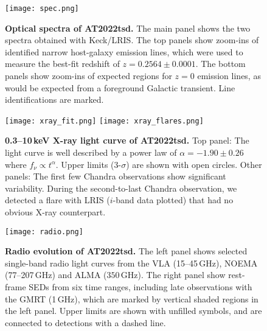 \documentclass{nature_plusfigure}
\newcommand{\at}{AT2022tsd}
\begin{document}
\begin{extended_data}

\renewcommand{\thefigure}{\arabic{figure}~Extended~Data}
\renewcommand{\thefigure}{Extended Data Figure \arabic{figure}}
\renewcommand{\figurename}{}
\setcounter{figure}{0}

\renewcommand{\thetable}{\arabic{table}~Extended~Data}
\renewcommand{\thetable}{Extended Data Table \arabic{table}}
\renewcommand{\tablename}{}
\setcounter{table}{0}

\begin{figure}[ht]
 \centering
\texttt{[image: spec.png]}
  \caption{\textbf{Optical spectra of \at.} The main panel shows the two spectra obtained with Keck/LRIS. The top panels show zoom-ins of identified narrow host-galaxy emission lines, which were used to measure the best-fit redshift of $z=0.2564\pm0.0001$. The bottom panels show zoom-ins of expected regions for $z=0$ emission lines, as would be expected from a foreground Galactic transient. Line identifications are marked.}
 \label{fig:spec}
\end{figure}

\begin{figure}[!ht]
 \centering
\texttt{[image: xray\_fit.png]}
\texttt{[image: xray\_flares.png]}
  \caption{\textbf{0.3--10\,keV X-ray light curve of \at.} Top panel: The light curve is well described by a power law of $\alpha=-1.90\pm0.26$ where $f_\nu \propto t^{\alpha}$. Upper limits (3-$\sigma$) are shown with open circles. Other panels: The first few Chandra observations show significant variability. During the second-to-last Chandra observation, we detected a flare with LRIS ($i$-band data plotted) that had no obvious X-ray counterpart.}
 \label{fig:xray-lc}
\end{figure}

\begin{figure}[!ht]
 \centering
\texttt{[image: radio.png]}
  \caption{\textbf{Radio evolution of \at.} The left panel shows selected single-band radio light curves from the VLA (15--45\,GHz), NOEMA (77--207\,GHz) and ALMA ($350$\,GHz). The right panel show rest-frame SEDs from six time ranges, including late observations with the GMRT (1\,GHz), which are marked by vertical shaded regions in the left panel. Upper limits are shown with unfilled symbols, and are connected to detections with a dashed line.}
 \label{fig:radio}
\end{figure}


\end{extended_data}
\end{document}
